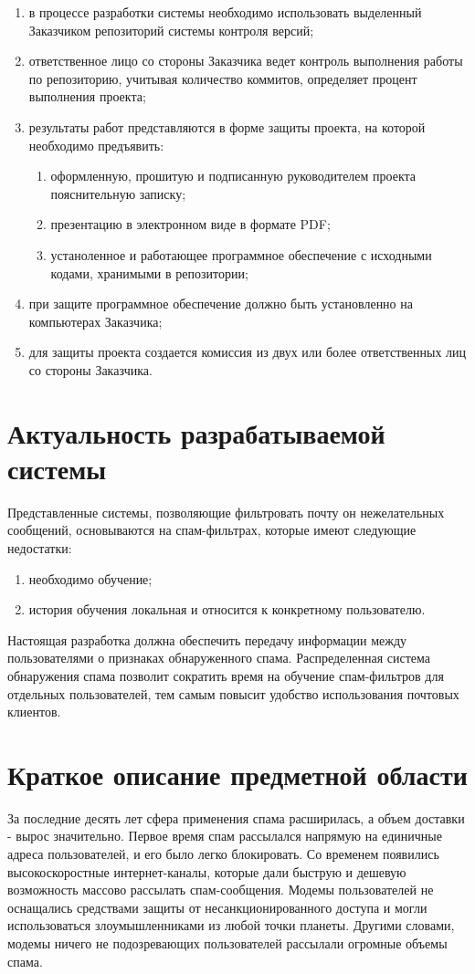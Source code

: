 \begin{enumerate}
	\item в процессе разработки системы необходимо использовать выделенный Заказчиком репозиторий системы контроля версий;
	\item ответственное лицо со стороны Заказчика ведет контроль выполнения работы по репозиторию, учитывая количество коммитов, определяет процент выполнения проекта;
	\item результаты работ представляются в форме защиты проекта, на которой необходимо предъявить:
		\begin{enumerate}
			\item оформленную, прошитую и подписанную руководителем проекта пояснительную записку;
			\item презентацию в электронном виде в формате PDF;
			\item устаноленное и работающее программное обеспечение с исходными кодами, хранимыми в репозитории;
		\end{enumerate}
	\item при защите программное обеспечение должно быть установленно на компьютерах Заказчика;
	\item для защиты проекта создается комиссия из двух или более ответственных лиц со стороны Заказчика.
\end{enumerate}


\section{Актуальность разрабатываемой системы}
Представленные системы, позволяющие фильтровать почту он нежелательных сообщений, основываются на спам-фильтрах, которые имеют следующие недостатки:

\begin{enumerate}
\item{необходимо обучение;}
\item{история обучения локальная и относится к конкретному пользователю.}
\end{enumerate}

Настоящая разработка должна обеспечить передачу информации между пользователями о признаках обнаруженного спама. Распределенная система обнаружения спама позволит сократить время на обучение спам-фильтров для отдельных пользователей, тем самым повысит удобство использования почтовых клиентов.



\section{Краткое описание предметной области}
За последние десять лет сфера применения спама расширилась, а объем доставки - вырос значительно. Первое время спам рассылался напрямую на единичные адреса пользователей, и его было легко блокировать. Со временем появились высокоскоростные интернет-каналы, которые дали быструю и дешевую возможность массово рассылать спам-сообщения. Модемы пользователей не оснащались средствами защиты от несанкционированного доступа и могли использоваться злоумышленниками из любой точки планеты. Другими словами, модемы ничего не подозревающих пользователей рассылали огромные объемы спама.

